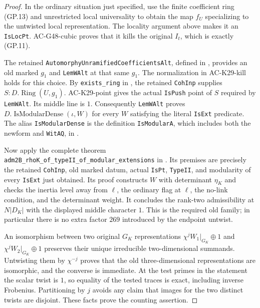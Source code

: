 \begin{proof}
In the ordinary situation just specified, use the finite
coefficient ring (GP.13) and unrestricted local universality
to obtain the map $f_U$ specializing to the untwisted local
representation.  The locality argument above makes it an
\texttt{IsLocPt}.  AC-G48-cubic proves that it kills the
original $I_t$, which is exactly (GP.11).

The retained \texttt{AutomorphyUnramifiedCoefficientsAlt},
defined in
,
provides an old marked $g_1$ and \texttt{LemWAlt} at that
same $g_1$.  The normalization in AC-K29-kill holds for this
choice.  By \texttt{exists\_ring} in
, the retained
\texttt{CohInp} supplies $S:D.\operatorname{Ring}(U,g_1)$.
AC-K29-point gives the actual \texttt{IsPush} point of $S$
required by \texttt{LemWAlt}.  Its middle line is $1$.
Consequently \texttt{LemWAlt} proves
$D.\operatorname{IsModularDense}(\iota,W)$ for every $W$
satisfying the literal \texttt{IsExt} predicate.
The alias \texttt{IsModularDense} is the definition
\texttt{IsModularA}, which includes both the newform and
\texttt{WitAQ}, in
.

Now apply the complete theorem
\texttt{adm2B\_rhoK\_of\_typeII\_of\_modular\_extensions}
in
.
Its premises are precisely the retained \texttt{CohInp},
old marked datum, actual \texttt{IsPt}, \texttt{TypeII}, and
modularity of every \texttt{IsExt} just obtained.
Its proof constructs $W$ with determinant $\eta_K$ and checks
the inertia level away from $\ell$, the ordinary flag at
$\ell$, the no-link condition, and the determinant weight.
It concludes the rank-two admissibility at $N|D_K|$ with
the displayed middle character $1$.  This is the required
old family; in particular there is no extra factor $269$
introduced by the endpoint untwist.

An isomorphism between two original $G_K$ representations
$\chi^j W_1|_{G_K}\oplus1$ and
$\chi^j W_2|_{G_K}\oplus1$ preserves their unique
irreducible two-dimensional summands.  Untwisting them by
$\chi^{-j}$ proves that the old three-dimensional
representations are isomorphic, and the converse is
immediate.  At the test primes in the statement the scalar
twist is $1$, so equality of the tested traces is exact,
including inverse Frobenius.  Partitioning by $j$ avoids
any claim that images for the two distinct twists are
disjoint.  These facts prove the counting assertion.
\end{proof}

